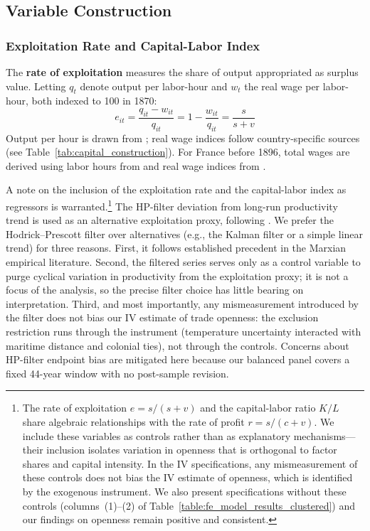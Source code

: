 \documentclass[10pt]{article}
\begin{document}
\subsection{Variable Construction}
\label{subsec:varcon}
\subsubsection{Exploitation Rate and Capital-Labor Index}
\label{subsec:exploitation}

The \textbf{rate of exploitation} measures the share of output appropriated as surplus value. Letting $q_t$ denote output per labor-hour and $w_t$ the real wage per labor-hour, both indexed to 100 in 1870:
\begin{equation}
e_{it} = \frac{q_{it} - w_{it}}{q_{it}} = 1 - \frac{w_{it}}{q_{it}} = \frac{s}{s+v}
\label{eq:exploitation}
\end{equation}
Output per hour is drawn from \citet{Maddison2010}; real wage indices follow country-specific sources (see Table~\ref{tab:capital_construction}). For France before 1896, total wages are derived using labor hours from \citet{Mitchell1975} and real wage indices from \citet{levy2008french}.

\par A note on the inclusion of the exploitation rate and the capital-labor index as regressors is warranted.\footnote{The rate of exploitation $e = s/(s+v)$ and the capital-labor ratio $K/L$ share algebraic relationships with the rate of profit $r = s/(c+v)$. We include these variables as controls rather than as explanatory mechanisms---their inclusion isolates variation in openness that is orthogonal to factor shares and capital intensity. In the IV specifications, any mismeasurement of these controls does not bias the IV estimate of openness, which is identified by the exogenous instrument. We also present specifications without these controls (columns~(1)--(2) of Table~\ref{table:fe_model_results_clustered}) and our findings on openness remain positive and consistent.} The HP-filter deviation from long-run productivity trend is used as an alternative exploitation proxy, following \citet{BasuManolakos2013}. We prefer the Hodrick--Prescott filter over alternatives (e.g., the Kalman filter or a simple linear trend) for three reasons. First, it follows established precedent in the Marxian empirical literature. Second, the filtered series serves only as a control variable to purge cyclical variation in productivity from the exploitation proxy; it is not a focus of the analysis, so the precise filter choice has little bearing on interpretation. Third, and most importantly, any mismeasurement introduced by the filter does not bias our IV estimate of trade openness: the exclusion restriction runs through the instrument (temperature uncertainty interacted with maritime distance and colonial ties), not through the controls. Concerns about HP-filter endpoint bias \citep{hamilton2018} are mitigated here because our balanced panel covers a fixed 44-year window with no post-sample revision.
\end{document}
